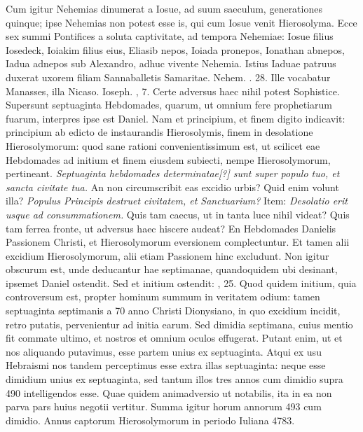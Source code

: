Cum igitur Nehemias dinumerat
a Iosue, ad suum saeculum, generationes quinque; ipse
Nehemias non potest esse is, qui cum Iosue venit Hierosolyma.
Ecce sex summi Pontifices a soluta captivitate, ad tempora Nehemiae:
Iosue filius Iosedeck, Ioiakim filius eius, Eliasib nepos,
Ioiada pronepos, Ionathan abnepos, Iadua adnepos sub Alexandro,
adhuc vivente Nehemia.
Istius Iaduae patruus duxerat uxorem
filiam Sannaballetis Samaritae.
Nehem. . 28.
Ille vocabatur
Manasses, illa Nicaso.
Ioseph. , 7.
Certe adversus haec
nihil potest Sophistice.
Supersunt septuaginta Hebdomades, quarum,
ut omnium fere prophetiarum fuarum, interpres ipse est Daniel.
Nam et principium, et finem digito indicavit: principium ab
edicto de instaurandis Hierosolymis, finem in desolatione Hierosolymorum:
quod sane rationi convenientissimum est, ut scilicet eae
Hebdomades ad initium et finem eiusdem subiecti, nempe Hierosolymorum,
pertineant.
\textit{Septuaginta hebdomades determinatae[?] sunt
super populo tuo, et sancta civitate tua.}
An non circumscribit eas
excidio urbis?
%
Quid enim volunt illa?
\textit{Populus Principis destruet civitatem,
et Sanctuarium?}
Item: \textit{Desolatio erit usque ad consummationem.}
Quis tam caecus, ut in tanta luce nihil videat?
Quis tam ferrea fronte, ut adversus haec hiscere audeat?
En Hebdomades
Danielis Passionem Christi, et Hierosolymorum eversionem complectuntur.
Et tamen alii excidium Hierosolymorum, alii etiam
Passionem hinc excludunt.
Non igitur obscurum est, unde deducantur
hae septimanae, quandoquidem ubi desinant, ipsemet Daniel
ostendit.
Sed et initium ostendit: , 25.
Quod quidem initium,
quia controversum est, propter hominum summum in veritatem
odium: tamen septuaginta septimanis a 70 anno Christi
Dionysiano, in quo excidium incidit, retro putatis, pervenientur
ad initia earum.
Sed dimidia septimana, cuius mentio fit commate
ultimo, et nostros et omnium oculos effugerat.
Putant enim,
ut et nos aliquando putavimus, esse partem unius ex septuaginta.
Atqui ex usu Hebraismi nos tandem perceptimus esse extra
 illas septuaginta:
neque esse dimidium unius ex septuaginta, sed tantum
illos tres annos cum dimidio supra 490 intelligendos esse.
Quae
quidem animadversio ut notabilis, ita in ea non parva pars huius
negotii vertitur.
Summa igitur horum annorum 493 cum dimidio.
Annus captorum Hierosolymorum in periodo Iuliana 4783.
